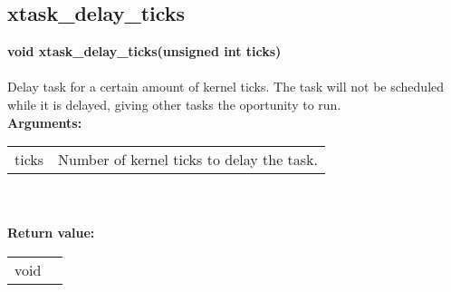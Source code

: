 \begin{samepage}
\subsection{xtask\_delay\_ticks}
\noindent
\textbf{void xtask\_delay\_ticks(unsigned int ticks)}\\\\
Delay task for a certain amount of kernel ticks. The task will not be scheduled
while it is delayed, giving other tasks the oportunity to run.\\

\noindent
\textbf{Arguments:}\\
\indent\begin{tabular}{ p{4.5cm}  p{9cm} }
ticks & Number of kernel ticks to delay the task.
\end{tabular}\\\\

\noindent
\textbf{Return value:}\\
\indent\begin{tabular}{  p{4.5cm}  p{9cm} }
void \\
\end{tabular}
\end{samepage}

